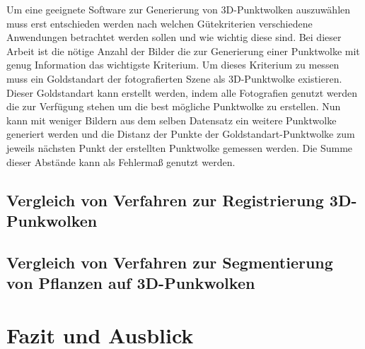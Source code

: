 \documentclass[12pt,titlepage]{article}
\begin{document}
Um eine geeignete Software zur Generierung von 3D-Punktwolken auszuwählen muss erst entschieden werden nach welchen Gütekriterien verschiedene Anwendungen betrachtet werden sollen und wie wichtig diese sind.
Bei dieser Arbeit ist die nötige Anzahl der Bilder die zur Generierung einer Punktwolke mit genug Information das wichtigste Kriterium. Um dieses Kriterium zu messen muss ein Goldstandart der fotografierten Szene als 3D-Punktwolke existieren.
Dieser Goldstandart kann erstellt werden, indem alle Fotografien genutzt werden die zur Verfügung stehen um die best mögliche Punktwolke zu erstellen. 
Nun kann mit weniger Bildern aus dem selben Datensatz ein weitere Punktwolke generiert werden und die Distanz der Punkte der Goldstandart-Punktwolke zum jeweils nächsten Punkt der erstellten Punktwolke gemessen werden.
Die Summe dieser Abstände kann als Fehlermaß genutzt werden.

\subsection{Vergleich von Verfahren zur Registrierung 3D-Punkwolken}



\subsection{Vergleich von Verfahren zur Segmentierung von Pflanzen auf 3D-Punkwolken}

\newpage
\section{Fazit und Ausblick}
\label{sec:fazit}
%





\newpage



\end{document}
